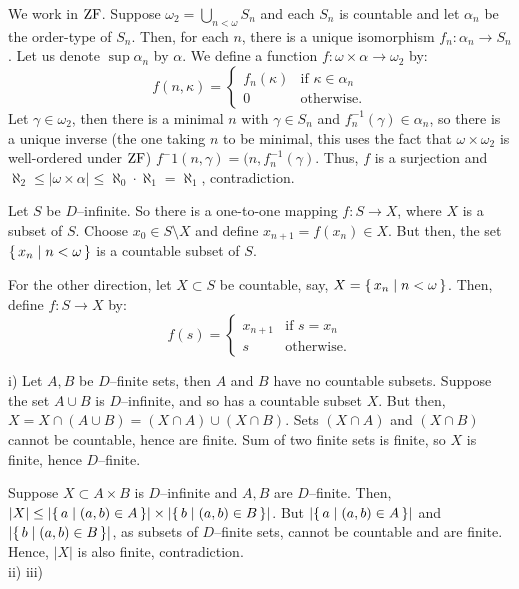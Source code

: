 \documentclass[12pt]{article}
\theoremstyle{definition}
\newenvironment{customthm}[1]
  {\renewcommand\theinnercustomthm{#1}\innercustomthm}
  {\endinnercustomthm}
\begin{document}
\begin{customthm}{I.3.13}
    We work in ${\rm ZF}$. Suppose $\omega_2 = \bigcup_{n < \omega} S_n$ and each $S_n$ is countable and let $\alpha_n$ be the order-type of $S_n$. Then, for each $n$, there is a unique isomorphism $f_n \colon \alpha_n \to S_n$. Let us denote $\sup \alpha_n$ by $\alpha$. We define a function $f \colon \omega \times \alpha \to \omega_2$ by:
    \begin{equation*}
        f(n, \kappa) = \begin{cases} f_n(\kappa) & \mbox{if } \kappa \in \alpha_n \\ 0 & \mbox{otherwise.} \end{cases}
    \end{equation*}
    Let $\gamma \in \omega_2$, then there is a minimal $n$ with $\gamma \in S_n$ and $f_n^{-1}(\gamma) \in \alpha_n$, so there is a unique inverse (the one taking $n$ to be minimal, this uses the fact that $\omega \times \omega_2$ is well-ordered under ${\rm ZF}$) $f^-1(n,\gamma) = (n,f_n^{-1}(\gamma)$. Thus, $f$ is a surjection and $\aleph_2 \leq |\omega \times \alpha| \leq \aleph_0 \cdot \aleph_1 = \aleph_1$, contradiction.
\end{customthm}

\begin{customthm}{I.3.14}
    Let $S$ be $D$--infinite. So there is a one-to-one mapping $f \colon S \to X$, where $X$ is a subset of $S$. Choose $x_0 \in S \setminus X$ and define $x_{n+1} = f(x_n) \in X$. But then, the set $\{\,{x_n \mid n < \omega}\,\}$ is a countable subset of $S$.
    
    For the other direction, let $X \subset S$ be countable, say, $X=\{\,{x_n \mid n < \omega}\,\}$. Then, define $f \colon S \to X$ by:
    \begin{equation*}
        f(s) = \begin{cases} x_{n+1} & \mbox{if } s = x_n \\ s & \mbox{otherwise.} \end{cases}
    \end{equation*}
\end{customthm}

\begin{customthm}{I.3.15}
    i) Let $A,B$ be $D$--finite sets, then $A$ and $B$ have no countable subsets. Suppose the set $A \cup B$ is $D$--infinite, and so has a countable subset $X$. But then, $X = X \cap (A \cup B) = (X \cap A) \cup (X \cap B)$. Sets $(X \cap A)$ and $(X \cap B)$ cannot be countable, hence are finite. Sum of two finite sets is finite, so $X$ is finite, hence $D$--finite.
    
    Suppose $X \subset A \times B$ is $D$--infinite and $A,B$ are $D$--finite. Then, $|X| \leq |\{\,{a \mid (a,b) \in A}\,\}| \times |\{\,{b \mid (a,b) \in B}\,\}|$. But $|\{\,{a \mid (a,b) \in A}\,\}|$ and $|\{\,{b \mid (a,b) \in B}\,\}|$, as subsets of $D$--finite sets, cannot be countable and are finite. Hence, $|X|$ is also finite, contradiction.
    \\
    ii)
    iii)
\end{customthm}
\end{document}
